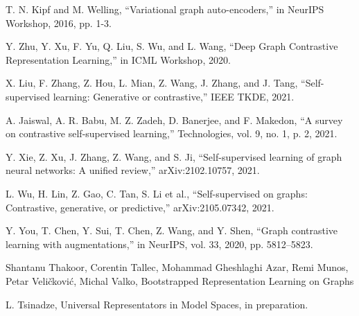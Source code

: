 \documentclass{beamer}
\begin{document}
\begin{thebibliography}{...}
     T. N. Kipf and M. Welling, 
    “Variational graph auto-encoders,” in NeurIPS Workshop, 2016, pp. 1-3. 

     Y. Zhu, Y. Xu, F. Yu, Q. Liu, S. Wu, and L. Wang, 
    “Deep Graph Contrastive Representation Learning,” in ICML Workshop, 2020. 

     X. Liu, F. Zhang, Z. Hou, L. Mian, Z. Wang, J. Zhang, 
    and J. Tang, 
    “Self-supervised learning: Generative or contrastive,” IEEE TKDE, 2021. 

     A. Jaiswal, A. R. Babu, M. Z. Zadeh, D. Banerjee, 
    and F. Makedon, 
    “A survey on contrastive self-supervised learning,” 
    Technologies, vol. 9, no. 1, p. 2, 2021. 

     Y. Xie, Z. Xu, J. Zhang, Z. Wang, and S. Ji, 
    “Self-supervised learning of graph neural networks: A unified review,” 
    arXiv:2102.10757, 2021.

     L. Wu, H. Lin, Z. Gao, C. Tan, S. Li et al., 
    “Self-supervised on graphs: Contrastive, generative, or predictive,” 
    arXiv:2105.07342, 2021. 

     Y. You, T. Chen, Y. Sui, T. Chen, Z. Wang, and Y. Shen, 
    “Graph contrastive learning with augmentations,” 
    in NeurIPS, vol. 33, 2020, pp. 5812–5823.

     Shantanu Thakoor, Corentin Tallec, Mohammad Gheshlaghi Azar, 
    Remi Munos, Petar Veličković, Michal Valko, 
    Bootstrapped Representation Learning on Graphs

     L. Tsinadze, Universal Representators in Model Spaces, 
    in preparation.
\end{thebibliography}
\end{document}
